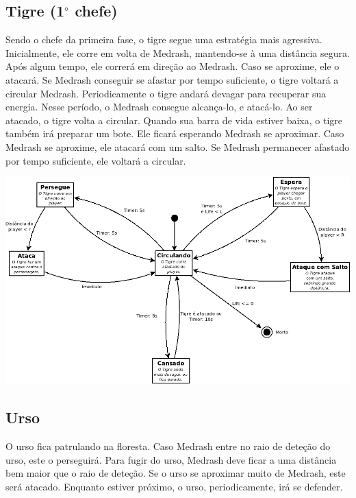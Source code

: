 \subsection{Tigre (1$^\circ$ chefe)}

Sendo o chefe da primeira fase, o tigre segue uma estratégia mais agressiva.
Inicialmente, ele corre em volta de Medrash, mantendo-se à uma distância
 segura. Após algum tempo, ele correrá em direção ao Medrash. Caso se
 aproxime, ele o atacará. Se Medrash conseguir se afastar por tempo
 suficiente, o tigre voltará a circular Medrash.
Periodicamente o tigre andará devagar para recuperar sua energia. Nesse
período, o Medrash consegue alcança-lo, e atacá-lo. Ao ser atacado, o tigre
volta a circular.
Quando sua barra de vida estiver baixa, o tigre também irá preparar um
bote. Ele ficará esperando Medrash se aproximar. Caso Medrash se aproxime,
 ele atacará com um salto. Se Medrash permanecer afastado por tempo 
suficiente, ele voltará a circular.

\begin{center}
 \includegraphics[scale=0.5]{ia_tigre.png}
\end{center}

\subsection{Urso}

O urso fica patrulando na floresta. Caso Medrash entre no raio de deteção
do urso, este o perseguirá. Para fugir do urso, Medrash deve ficar a uma
distância bem maior que o raio de deteção.
Se o urso se aproximar muito de Medrash, este será atacado. Enquanto estiver
próximo, o urso, periodicamente, irá se defender.

